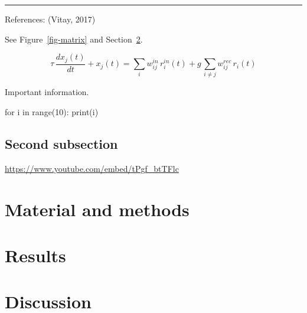 \documentclass[
  a4paper,
]{article}
\newenvironment{Shaded}{}{}
\newcommand{\BuiltInTok}[1]{\textcolor[rgb]{0.84,0.23,0.29}{#1}}
\newcommand{\ControlFlowTok}[1]{\textcolor[rgb]{0.84,0.23,0.29}{#1}}
\newcommand{\DecValTok}[1]{\textcolor[rgb]{0.00,0.36,0.77}{#1}}
\newcommand{\KeywordTok}[1]{\textcolor[rgb]{0.84,0.23,0.29}{#1}}
\newcommand{\NormalTok}[1]{\textcolor[rgb]{0.14,0.16,0.18}{#1}}
\begin{document}
\begin{center}\rule{0.5\linewidth}{0.5pt}\end{center}

References: (Vitay, 2017)

See Figure~\ref{fig-matrix} and Section~\ref{sec-results}.

\[
    \tau \, \frac{dx_j(t)}{dt} + x_j(t)= \sum_i w^{in}_{ij} \, r^{in}_i(t) + g \, \sum_{i \neq j} w^{rec}_{ij} \, r_i(t)
\]

\begin{tcolorbox}[enhanced jigsaw, bottomrule=.15mm, opacitybacktitle=0.6, coltitle=black, bottomtitle=1mm, rightrule=.15mm, colback=white, opacityback=0, leftrule=.75mm, arc=.35mm, toptitle=1mm, left=2mm, colbacktitle=quarto-callout-note-color!10!white, colframe=quarto-callout-note-color-frame, breakable, titlerule=0mm, title=\textcolor{quarto-callout-note-color}{\faInfo}\hspace{0.5em}{Nota Bene}, toprule=.15mm]

Important information.

\end{tcolorbox}

\begin{Shaded}
\begin{Highlighting}[]
\ControlFlowTok{for}\NormalTok{ i }\KeywordTok{in} \BuiltInTok{range}\NormalTok{(}\DecValTok{10}\NormalTok{):}
    \BuiltInTok{print}\NormalTok{(i)}
\end{Highlighting}
\end{Shaded}

\hypertarget{second-subsection}{%
\subsection{Second subsection}\label{second-subsection}}

\url{https://www.youtube.com/embed/tPgf_btTFlc}

\hypertarget{material-and-methods}{%
\section{Material and methods}\label{material-and-methods}}

\hypertarget{sec-results}{%
\section{Results}\label{sec-results}}

\hypertarget{discussion}{%
\section{Discussion}\label{discussion}}
\end{document}
